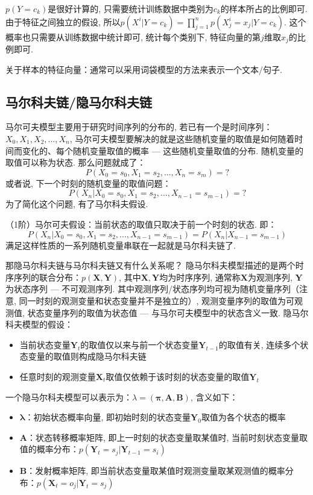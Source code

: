 $p(Y=c_k)$是很好计算的, 只需要统计训练数据中类别为$c_k$的样本所占的比例即可. 由于特征之间独立的假设, 所以$p(X^i | Y=c_k) = \prod_{j=1}^{n} p(X_{j}^{i}=x_j | Y=c_k)$. 这个概率也只需要从训练数据中统计即可, 统计每个类别下, 特征向量的第$j$维取$x_j$的比例即可. 

关于样本的特征向量：通常可以采用词袋模型的方法来表示一个文本/句子. 

\subsection{马尔科夫链/隐马尔科夫链}
马尔可夫模型主要用于研究时间序列的分布的, 若已有一个是时间序列：$X_0, X_1, X_2, ..., X_n$, 马尔可夫模型要解决的就是这些随机变量的取值是如何随着时间而变化的、每个随机变量取值的概率 --- 这些随机变量取值的分布. 随机变量的取值可以称为状态. 那么问题就成了：
$$
P(X_0=s_0, X_1=s_2, ..., X_n=s_m) = ?
$$
或者说, 下一个时刻的随机变量的取值问题：
$$
P(X_n | X_0=s_0, X_1=s_2, ..., X_{n-1}=s_{m-1}) = ?
$$
为了简化这个问题, 有了马尔科夫假设. 

（1阶）马尔可夫假设：当前状态的取值只取决于前一个时刻的状态. 即：
$$
P(X_n | X_0=s_0, X_1=s_2, ..., X_{n-1}=s_{m-1}) = P(X_n | X_{n-1}=s_{m-1})
$$
满足这样性质的一系列随机变量串联在一起就是马尔科夫链了. 

那隐马尔科夫链与马尔科夫链又有什么关系呢？
隐马尔科夫模型描述的是两个时序序列的联合分布：$p( \boldsymbol{X}, \boldsymbol{Y} )$, 其中$\boldsymbol{X}, \boldsymbol{Y}$均为时序序列, 通常称$\boldsymbol{X}$为观测序列, $\boldsymbol{Y}$为状态序列 --- 不可观测序列. 其中观测序列/状态序列均可视为随机变量序列（注意, 同一时刻的观测变量和状态变量并不是独立的）, 观测变量序列的取值为可观测值, 状态变量序列的取值为状态值 --- 与马尔可夫模型中的状态含义一致. 隐马尔科夫模型的假设：
\begin{itemize}
	\item 当前状态变量$\boldsymbol{Y}_t$的取值仅以来与前一个状态变量$\boldsymbol{Y}_{t-1}$的取值有关, 连续多个状态变量的取值则构成隐马尔科夫链
	\item 任意时刻的观测变量$\boldsymbol{X}_t$取值仅依赖于该时刻的状态变量的取值$\boldsymbol{Y}_t$
\end{itemize}

一个隐马尔科夫模型可以表示为：$\lambda = (\boldsymbol{\pi}, \boldsymbol{A}, \boldsymbol{B})$, 含义如下：
\begin{itemize}
	\item $\boldsymbol{\lambda}$：初始状态概率向量, 即初始时刻的状态变量$\boldsymbol{Y}_0$取值为各个状态的概率
	\item $\boldsymbol{A}$：状态转移概率矩阵, 即上一时刻的状态变量取某值时, 当前时刻状态变量取值的概率分布：$p(\boldsymbol{Y}_t=s_j | \boldsymbol{Y}_{t-1}=s_i)$
	\item $\boldsymbol{B}$：发射概率矩阵, 即当前状态变量取某值时观测变量取某观测值的概率分布：$p(\boldsymbol{X}_t=o_j | \boldsymbol{Y}_t=s_j)$
\end{itemize}

